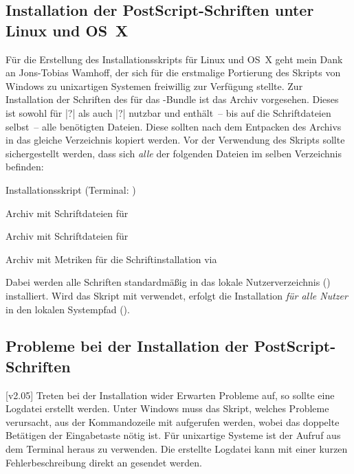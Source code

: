 \subsection{Installation der PostScript-Schriften unter Linux und OS~X}
\label{sec:install:unix}%
%
Für die Erstellung des Installationsskripts für Linux und OS~X geht mein Dank 
an Jons-Tobias Wamhoff, der sich für die erstmalige Portierung des Skripts 
von Windows zu unixartigen Systemen freiwillig zur Verfügung stellte.
Zur Installation der Schriften des \CDs für das \TUDScript-Bundle ist das Archiv
%
{} vorgesehen. Dieses ist sowohl für 
|?| als auch |?| 
nutzbar und enthält~-- bis auf die Schriftdateien selbst~-- alle benötigten 
Dateien. Diese sollten nach dem Entpacken des Archivs in das gleiche 
Verzeichnis kopiert werden. Vor der Verwendung des Skripts 
 sollte sichergestellt werden, dass sich 
\emph{alle} der folgenden Dateien im selben Verzeichnis befinden:
%
\settowidth{}%
\begin{description}[labelwidth=\tempdim,labelsep=1em]
  \item[\File{tudscrfonts\_install.sh}]Installationsskript
    (Terminal: )
  \item[\File{Univers\_PS.zip}]Archiv mit Schriftdateien für \Univers
  \item[\File{DIN\_Bd\_PS.zip}]Archiv mit Schriftdateien für \DIN
  \item[\File{tudscrfonts.zip}]Archiv mit Metriken für die
    Schriftinstallation via 
\end{description}
%
Dabei werden alle Schriften standardmäßig in das lokale Nutzerverzeichnis 
() installiert. Wird das Skript mit  verwendet, 
erfolgt die Installation \emph{für alle Nutzer} in den lokalen Systempfad 
().



\subsection*{Probleme bei der Installation der PostScript-Schriften}
[v2.05]
Treten bei der Installation wider Erwarten Probleme auf, so sollte eine 
Logdatei erstellt werden. Unter Windows muss das Skript, welches Probleme 
verursacht, aus der Kommandozeile mit
 aufgerufen werden, wobei das 
doppelte Betätigen der Eingabetaste nötig ist. Für unixartige Systeme 
ist der Aufruf  aus dem 
Terminal heraus zu verwenden. Die erstellte Logdatei kann mit einer kurzen 
Fehlerbeschreibung direkt an \Email{\tudscrmail} gesendet werden.
%


